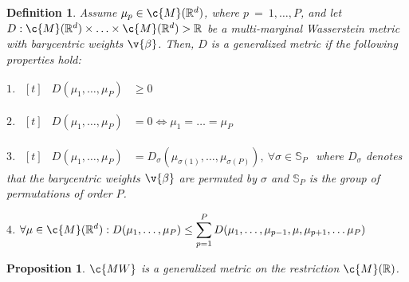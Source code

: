 \documentclass{article}
\newtheorem{proposition}[theorem]{Proposition}
\newtheorem{definition}[theorem]{Definition}
\begin{document}
\begin{definition}
\label{def:mw_prop}
Assume $\mu_p \in \c{M}(\R^d)$, where  $p~=~1,\ldots, P$, and let $D:\c{M}(\R^d)\times \ldots \times \c{M}(\R^d) \-> \mathbb{R} $ be a multi-marginal Wasserstein metric with barycentric weights $\v{\beta}$. Then, $D$ is a generalized metric if the following properties hold:
\begin{list}{}{\leftmargin=0.25em}
   \addtolength{\itemsep}{-.215\baselineskip}
    \item[$1$.] $\begin{aligned}[t] &D(\mu_1,\ldots,\mu_P) &\geq 0 \end{aligned}$ \label{pro:1}
    \item[$2$.] $\begin{aligned}[t] &D(\mu_1,\ldots,\mu_P) & = 0  \Leftrightarrow \mu_1 =\ldots = \mu_P \end{aligned}$\label{pro:2}
    \item[$3$.] $\begin{aligned}[t] &D(\mu_1,\ldots,\mu_P) & =D_\sigma(\mu_{\sigma(1)},\ldots,\mu_{\sigma(P)}), \ \forall \sigma \in \mathbb{S}_P \end{aligned}$ where $D_\sigma$ denotes that the barycentric weights $\v{\beta}$ are permuted by $\sigma$ and $\mathbb{S}_P$ is the group of permutations of order $P$. \label{pro:3}
    \item[$4$.] $\begin{aligned}[t] &\forall \mu \in \c{M}(\R^d):D(\mu_1,\ldots,\mu_P)                \leq  \sum_{p=1}^P D(\mu_1,\ldots,\mu_{p-1},\mu,\mu_{p+1},\ldots  \mu_{P})& \end{aligned} $\label{pro:4}
\end{list}
\end{definition}

\begin{proposition}
\label{prop:mw_prop_cont}
$\c{MW}$ is a generalized metric on the restriction $\c{M}(\mathbb{R})$.
\end{proposition}
\end{document}
